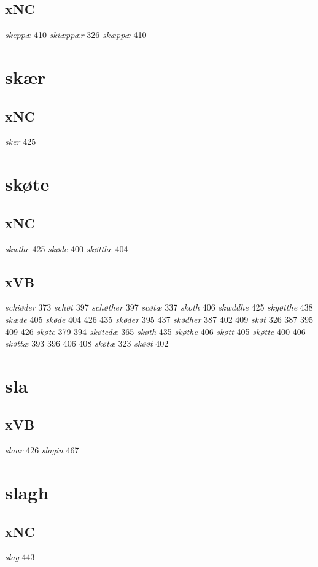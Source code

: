 \documentclass[a4paper,twocolumn]{article}
\begin{document}
\subsection{xNC}
\label{sec:org6763681}
\emph{skeppæ} 410 \emph{skiæppær} 326 \emph{skæppæ} 410 
\section{skær}
\label{sec:org1f2d278}
\subsection{xNC}
\label{sec:orgcfd3e79}
\emph{sker} 425 
\section{skøte}
\label{sec:org4308307}
\subsection{xNC}
\label{sec:org32060cd}
\emph{skwthe} 425 \emph{skøde} 400 \emph{skøtthe} 404 
\subsection{xVB}
\label{sec:org044a314}
\emph{schiøder} 373 \emph{schøt} 397 \emph{schøther} 397 \emph{scøtæ} 337 \emph{skoth} 406 \emph{skwddhe} 425 \emph{skyøtthe} 438 \emph{skæde} 405 \emph{skøde} 404 426 435 \emph{skøder} 395 437 \emph{skødher} 387 402 409 \emph{skøt} 326 387 395 409 426 \emph{skøte} 379 394 \emph{skøtedæ} 365 \emph{skøth} 435 \emph{skøthe} 406 \emph{skøtt} 405 \emph{skøtte} 400 406 \emph{skøttæ} 393 396 406 408 \emph{skøtæ} 323 \emph{skøøt} 402 
\section{sla}
\label{sec:org9baf27c}
\subsection{xVB}
\label{sec:orgbbce32d}
\emph{slaar} 426 \emph{slagin} 467 
\section{slagh}
\label{sec:orgeca94fe}
\subsection{xNC}
\label{sec:orga00a84f}
\emph{slag} 443 
\end{document}
